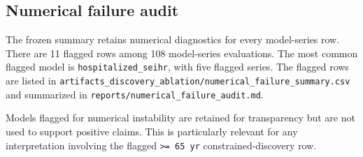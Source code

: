 \subsection{Numerical failure audit}

The frozen summary retains numerical diagnostics for every model-series row.
There are 11 flagged rows among 108 model-series evaluations. The most common
flagged model is \texttt{hospitalized\_seihr}, with five flagged series. The
flagged rows are listed in
\texttt{artifacts\_discovery\_ablation/numerical\_failure\_summary.csv} and
summarized in \texttt{reports/numerical\_failure\_audit.md}.

Models flagged for numerical instability are retained for transparency but are
not used to support positive claims. This is particularly relevant for any
interpretation involving the flagged \texttt{>= 65 yr} constrained-discovery
row.
